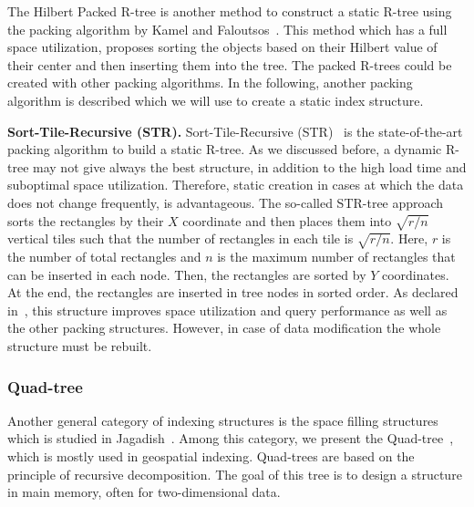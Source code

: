 \documentclass[a4paper,12pt]{article}
\begin{document}
The Hilbert Packed R-tree is another method to construct a static R-tree using the packing algorithm by Kamel and Faloutsos~\cite{hilbert-rtree}. This method which has a full space utilization, proposes sorting the objects based on their Hilbert value of their center and then inserting them into the tree.
The packed R-trees could be created with other packing algorithms. In the following, another packing algorithm is described which we will use to create a static index structure.

\textbf{Sort-Tile-Recursive (STR).} Sort-Tile-Recursive (STR)~\cite{strtree} is the state-of-the-art packing algorithm to build a static R-tree. As we discussed before, a dynamic R-tree may not give always the best structure, in addition to the high load time and suboptimal space utilization. Therefore, static creation in cases at which the data does not change frequently, is advantageous. The so-called STR-tree approach sorts the rectangles by their $X$ coordinate and then places them into $\sqrt{r/n}$ vertical tiles such that the number of rectangles in each tile is $\sqrt{r/n}$. Here, $r$ is the number of total rectangles and $n$ is the maximum number of rectangles that can be inserted in each node. Then, the rectangles are sorted by $Y$ coordinates. At the end, the rectangles are inserted in tree nodes in sorted order.
As declared in~\cite{strtree}, this structure improves space utilization and query performance as well as the other packing structures. However, in case of data modification the whole structure must be rebuilt.

\subsubsection{Quad-tree}
\label{quad-tree-based}
Another general category of indexing structures is the space filling structures which is studied in Jagadish~\cite{spacefilling}.
Among this category, we present the Quad-tree~\cite{quadtree}, which is mostly used in geospatial indexing. Quad-trees are based on the principle of recursive decomposition. The goal of this tree is to design a structure in main memory, often for two-dimensional data. 
\end{document}
